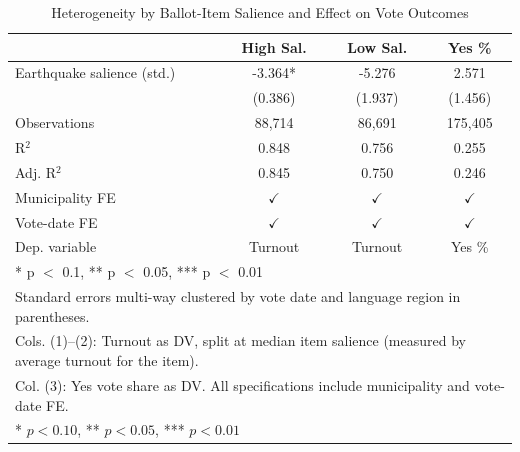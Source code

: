 \begin{table}
\centering
\caption{Heterogeneity by Ballot-Item Salience and Effect on Vote Outcomes \label{tab:het}}
\centering
\begin{tabular}[t]{lccc}
\toprule
  & High Sal. & Low Sal. & Yes \%\\
\midrule
Earthquake salience (std.) & -3.364* & -5.276 & 2.571\\
 & (0.386) & (1.937) & (1.456)\\
\midrule
Observations & 88,714 & 86,691 & 175,405\\
R$^2$ & 0.848 & 0.756 & 0.255\\
Adj. R$^2$ & 0.845 & 0.750 & 0.246\\
Municipality FE & $\checkmark$ & $\checkmark$ & $\checkmark$\\
Vote-date FE & $\checkmark$ & $\checkmark$ & $\checkmark$\\
Dep. variable & Turnout & Turnout & Yes \%\\
\bottomrule
\multicolumn{4}{p{0.95\textwidth}}{\rule{0pt}{1em}* p $<$ 0.1, ** p $<$ 0.05, *** p $<$ 0.01}\\
\multicolumn{4}{p{0.95\textwidth}}{\rule{0pt}{1em}Standard errors multi-way clustered by vote date and language region in parentheses.}\\
\multicolumn{4}{p{0.95\textwidth}}{\rule{0pt}{1em}Cols. (1)--(2): Turnout as DV, split at median item salience (measured by average turnout for the item).}\\
\multicolumn{4}{p{0.95\textwidth}}{\rule{0pt}{1em}Col. (3): Yes vote share as DV. All specifications include municipality and vote-date FE.}\\
\multicolumn{4}{p{0.95\textwidth}}{\rule{0pt}{1em}* $p<0.10$, ** $p<0.05$, *** $p<0.01$}\\
\end{tabular}
\end{table}
